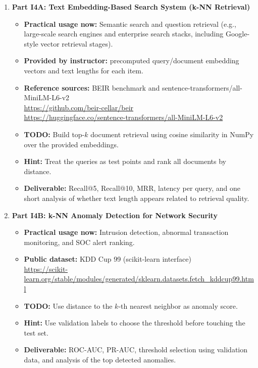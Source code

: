 \begin{enumerate}[label=\textbf{I\arabic*.}]
  \item \textbf{Part I4A: Text Embedding-Based Search System (k-NN Retrieval)}
  \begin{itemize}
    \item \textbf{Practical usage now:} Semantic search and question retrieval (e.g., large-scale search engines and enterprise search stacks, including Google-style vector retrieval stages).
    \item \textbf{Provided by instructor:} precomputed query/document embedding vectors and text lengths for each item.
    \item \textbf{Reference sources:} BEIR benchmark and sentence-transformers/all-MiniLM-L6-v2\\
    \url{https://github.com/beir-cellar/beir}\\
    \url{https://huggingface.co/sentence-transformers/all-MiniLM-L6-v2}
    \item \textbf{TODO:} Build top-$k$ document retrieval using cosine similarity in NumPy over the provided embeddings.
    \item \textbf{Hint:} Treat the queries as test points and rank all documents by distance.
    \item \textbf{Deliverable:} Recall@5, Recall@10, MRR, latency per query, and one short analysis of whether text length appears related to retrieval quality.
  \end{itemize}

  \item \textbf{Part I4B: k-NN Anomaly Detection for Network Security}
  \begin{itemize}
    \item \textbf{Practical usage now:} Intrusion detection, abnormal transaction monitoring, and SOC alert ranking.
    \item \textbf{Public dataset:} KDD Cup 99 (scikit-learn interface)\\
    \url{https://scikit-learn.org/stable/modules/generated/sklearn.datasets.fetch_kddcup99.html}
    \item \textbf{TODO:} Use distance to the $k$-th nearest neighbor as anomaly score.
    \item \textbf{Hint:} Use validation labels to choose the threshold before touching the test set.
    \item \textbf{Deliverable:} ROC-AUC, PR-AUC, threshold selection using validation data, and analysis of the top detected anomalies.
  \end{itemize}
\end{enumerate}

